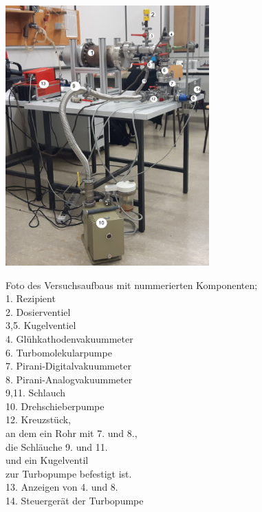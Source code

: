 \begin{figure}
  \caption[justification=centering]{Foto des Versuchsaufbaus mit nummerierten Komponenten; \\
1. Rezipient\\
2. Dosierventiel\\
3,5. Kugelventiel \\
4. Glühkathodenvakuummeter\\
6. Turbomolekularpumpe\\
7. Pirani-Digitalvakuummeter\\
8. Pirani-Analogvakuummeter\\
9,11. Schlauch\\
10. Drehschieberpumpe\\
12. Kreuzstück, \\
an dem ein Rohr mit 7. und 8., \\
die Schläuche 9. und 11.\\
 und ein Kugelventil \\
 zur Turbopumpe befestigt ist.\\
13. Anzeigen von 4. und 8. \\
14. Steuergerät der Turbopumpe \\
}
  \includegraphics[height  = 10cm]{pics/V3B2.jpg}
  \label{fig:Aufbau}
\end{figure}


